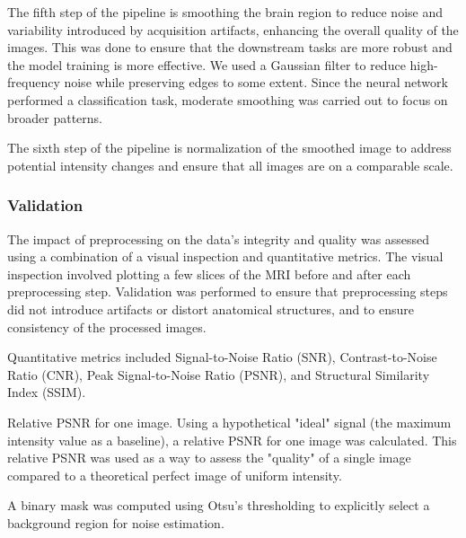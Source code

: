 The fifth step of the pipeline is smoothing the brain region to reduce noise and variability introduced by acquisition artifacts, enhancing the overall quality of the images. This was done to ensure that the downstream tasks are more robust and the model training is more effective. We used a Gaussian filter to reduce high-frequency noise while preserving edges to some extent. Since the neural network performed a classification task, moderate smoothing was carried out to focus on broader patterns.

The sixth step of the pipeline is normalization of the smoothed image to address potential intensity changes and ensure that all images are on a comparable scale.

\subsubsection{Validation}

The impact of preprocessing on the data's integrity and quality was assessed using a combination of a visual inspection and quantitative metrics. The visual inspection involved plotting a few slices of the MRI before and after each preprocessing step. Validation was performed to ensure that preprocessing steps did not introduce artifacts or distort anatomical structures, and to ensure consistency of the processed images.

Quantitative metrics included Signal-to-Noise Ratio (SNR), Contrast-to-Noise Ratio (CNR), Peak Signal-to-Noise Ratio (PSNR), and 
Structural Similarity Index (SSIM). 

Relative PSNR for one image. Using a hypothetical "ideal" signal (the maximum intensity value as a baseline), a relative PSNR for one image was calculated. This relative PSNR was used as a way to assess the "quality" of a single image compared to a theoretical perfect image of uniform intensity.

A binary mask was computed using Otsu's thresholding to explicitly select a background region for noise estimation.

